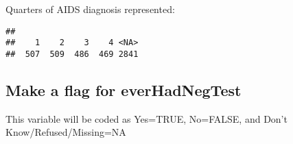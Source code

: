 \documentclass{article}\usepackage[]{graphicx}\usepackage[]{color}
\makeatletter
\newenvironment{kframe}{%
 \def\at@end@of@kframe{}%
 \ifinner\ifhmode%
  \def\at@end@of@kframe{\end{minipage}}%
  \begin{minipage}{\columnwidth}%
 \fi\fi%
 \def\FrameCommand##1{\hskip\@totalleftmargin \hskip-\fboxsep
 \colorbox{shadecolor}{##1}\hskip-\fboxsep
     \hskip-\linewidth \hskip-\@totalleftmargin \hskip\columnwidth}%
 \MakeFramed {\advance\hsize-\width
   \@totalleftmargin\z@ \linewidth\hsize
   \@setminipage}}%
 {\par\unskip\endMakeFramed%
 \at@end@of@kframe}
\newenvironment{knitrout}{}{} %
\makeatother
\begin{document}
Quarters of AIDS diagnosis represented:
\begin{knitrout}
\color{fgcolor}\begin{kframe}
\begin{verbatim}
## 
##    1    2    3    4 <NA> 
##  507  509  486  469 2841
\end{verbatim}
\end{kframe}
\end{knitrout}


\subsection{Make a flag for everHadNegTest}

This variable will be coded as Yes=TRUE, No=FALSE, and Don't Know/Refused/Missing=NA
\end{document}
